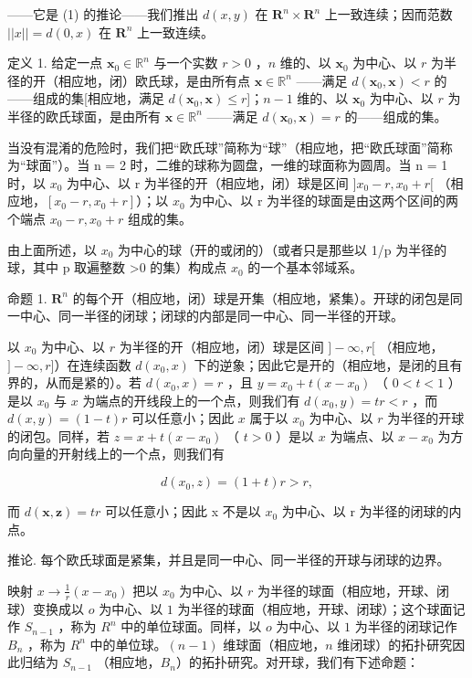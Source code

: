 ——它是 (1) 的推论——我们推出 \(d(x, y)\) 在 \(\mathbf{R}^n \times \mathbf{R}^n\) 上一致连续；因而范数 \(||x|| = d(0, x)\) 在 \(\mathbf{R}^n\) 上一致连续。

定义 1. 给定一点 \(\mathbf{x}_0 \in \mathbb{R}^n\) 与一个实数 \(r > 0\) ，\(n\) 维的、以 \(\mathbf{x}_0\) 为中心、以 \(r\) 为半径的开（相应地，闭）欧氏球，是由所有点 \(\mathbf{x} \in \mathbb{R}^n\) ——满足 \(d(\mathbf{x}_0, \mathbf{x}) < r\) 的——组成的集{[}相应地，满足 \(d(\mathbf{x}_0, \mathbf{x}) \leqslant r\){]}；\(n - 1\) 维的、以 \(\mathbf{x}_0\) 为中心、以 \(r\) 为半径的欧氏球面，是由所有 \(\mathbf{x} \in \mathbb{R}^n\) ——满足 \(d(\mathbf{x}_0, \mathbf{x}) = r\) 的——组成的集。

当没有混淆的危险时，我们把“欧氏球”简称为“球”（相应地，把“欧氏球面”简称为“球面”）。当 n = 2 时，二维的球称为圆盘，一维的球面称为圆周。当 n = 1 时，以 \(x_{0}\) 为中心、以 r 为半径的开（相应地，闭）球是区间 \(]x_{0} - r, x_{0} + r[\) （相应地，\([x_{0} - r, x_{0} + r]\)）；以 \(x_{0}\) 为中心、以 r 为半径的球面是由这两个区间的两个端点 \(x_{0} - r, x_{0} + r\) 组成的集。

由上面所述，以 \(x_{0}\) 为中心的球（开的或闭的）（或者只是那些以 1/p 为半径的球，其中 p 取遍整数 \textgreater0 的集）构成点 \(x_{0}\) 的一个基本邻域系。

命题 1. \(\mathbf{R}^n\) 的每个开（相应地，闭）球是开集（相应地，紧集）。开球的闭包是同一中心、同一半径的闭球；闭球的内部是同一中心、同一半径的开球。

以 \(x_0\) 为中心、以 \(r\) 为半径的开（相应地，闭）球是区间 \(] - \infty, r[\) （相应地，\(] - \infty, r]\)）在连续函数 \(d(x_0, x)\) 下的逆象；因此它是开的（相应地，是闭的且有界的，从而是紧的）。若 \(d(x_0, x) = r\) ，且 \(y = x_0 + t(x - x_0)\) （ \(0 < t < 1\) ）是以 \(x_0\) 与 \(x\) 为端点的开线段上的一个点，则我们有 \(d(x_0, y) = tr < r\) ，而 \(d(x, y) = (1 - t)r\) 可以任意小；因此 \(x\) 属于以 \(x_0\) 为中心、以 \(r\) 为半径的开球的闭包。同样，若 \(z = x + t(x - x_0)\) （ \(t > 0\) ）是以 \(x\) 为端点、以 \(x - x_0\) 为方向向量的开射线上的一个点，则我们有

\[
d (x _ {0}, z) = (1 + t) r > r,
\]

而 \(d(\boldsymbol{x}, \boldsymbol{z}) = tr\) 可以任意小；因此 x 不是以 \(x_{0}\) 为中心、以 r 为半径的闭球的内点。

推论. 每个欧氏球面是紧集，并且是同一中心、同一半径的开球与闭球的边界。

映射 \(x \to \frac{1}{r} (x - x_0)\) 把以 \(x_0\) 为中心、以 \(r\) 为半径的球面（相应地，开球、闭球）变换成以 \(o\) 为中心、以 \(1\) 为半径的球面（相应地，开球、闭球）；这个球面记作 \(S_{n-1}\) ，称为 \(R^n\) 中的单位球面。同样，以 \(o\) 为中心、以 \(1\) 为半径的闭球记作 \(B_n\) ，称为 \(R^n\) 中的单位球。\((n - 1)\) 维球面（相应地，\(n\) 维闭球）的拓扑研究因此归结为 \(S_{n-1}\) （相应地，\(B_n\)）的拓扑研究。对开球，我们有下述命题：

